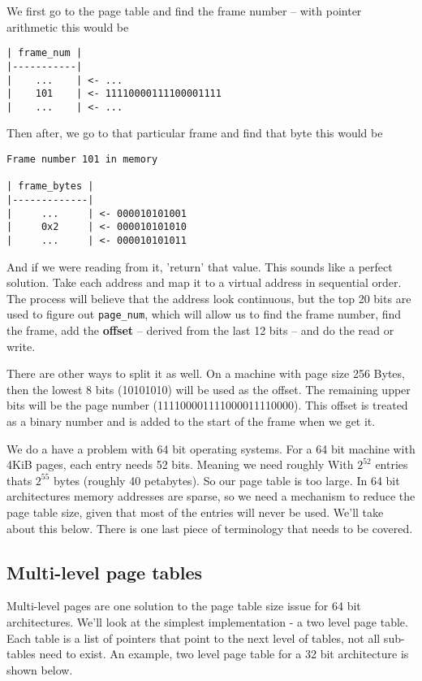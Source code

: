 We first go to the page table and find the frame number -- with pointer arithmetic this would be 

\begin{verbatim}
| frame_num |
|-----------|
|    ...    | <- ...
|    101    | <- 11110000111100001111
|    ...    | <- ...
\end{verbatim}

Then after, we go to that particular frame and find that byte this would be 

\begin{verbatim}
Frame number 101 in memory

| frame_bytes |
|-------------|
|     ...     | <- 000010101001
|     0x2     | <- 000010101010
|     ...     | <- 000010101011
\end{verbatim}

And if we were reading from it, 'return' that value.
This sounds like a perfect solution.
Take each address and map it to a virtual address in sequential order.
The process will believe that the address look continuous, but the top 20 bits are used to figure out \texttt{page\_num},
which will allow us to find the frame number, find the frame, add the \textbf{offset} -- derived from the last 12 bits -- and do the read or write.

There are other ways to split it as well.
On a machine with page size 256 Bytes, then the lowest 8 bits (10101010) will be used as the offset.
The remaining upper bits will be the page number (111100001111000011110000). This offset is treated as a binary number and is added to the start of the frame when we get it.

We do a have a problem with 64 bit operating systems.
For a 64 bit machine with 4KiB pages, each entry needs 52 bits.
Meaning we need roughly
With $2^{52}$ entries thats $2^{55}$ bytes (roughly 40 petabytes).
So our page table is too large.
In 64 bit architectures memory addresses are sparse, so we need a mechanism to reduce the page table size, given that most of the entries will never be used.
We'll take about this below. There is one last piece of terminology that needs to be covered.

\subsection{Multi-level page tables}

Multi-level pages are one solution to the page table size issue for 64 bit architectures.
We'll look at the simplest implementation - a two level page table.
Each table is a list of pointers that point to the next level of tables, not all sub-tables need to exist.
An example, two level page table for a 32 bit architecture is shown below.

